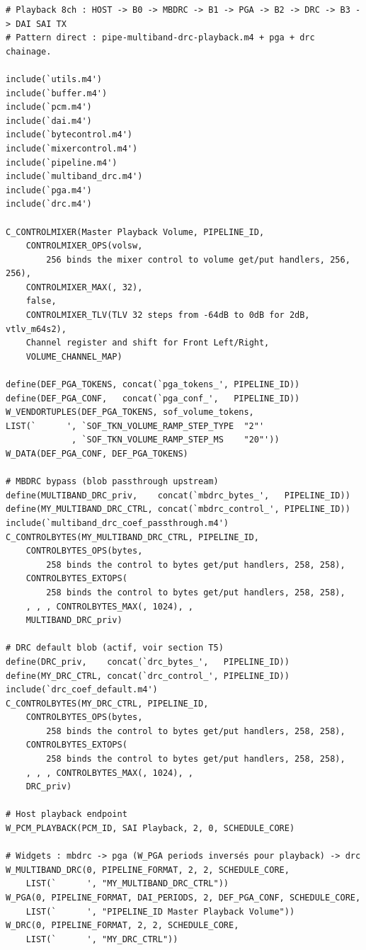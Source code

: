 \documentclass[11pt,a4paper]{article}
\begin{document}
\begin{lstlisting}[language={}, basicstyle=\ttfamily\scriptsize]
# Playback 8ch : HOST -> B0 -> MBDRC -> B1 -> PGA -> B2 -> DRC -> B3 -> DAI SAI TX
# Pattern direct : pipe-multiband-drc-playback.m4 + pga + drc chainage.

include(`utils.m4')
include(`buffer.m4')
include(`pcm.m4')
include(`dai.m4')
include(`bytecontrol.m4')
include(`mixercontrol.m4')
include(`pipeline.m4')
include(`multiband_drc.m4')
include(`pga.m4')
include(`drc.m4')

C_CONTROLMIXER(Master Playback Volume, PIPELINE_ID,
    CONTROLMIXER_OPS(volsw,
        256 binds the mixer control to volume get/put handlers, 256, 256),
    CONTROLMIXER_MAX(, 32),
    false,
    CONTROLMIXER_TLV(TLV 32 steps from -64dB to 0dB for 2dB, vtlv_m64s2),
    Channel register and shift for Front Left/Right,
    VOLUME_CHANNEL_MAP)

define(DEF_PGA_TOKENS, concat(`pga_tokens_', PIPELINE_ID))
define(DEF_PGA_CONF,   concat(`pga_conf_',   PIPELINE_ID))
W_VENDORTUPLES(DEF_PGA_TOKENS, sof_volume_tokens,
LIST(`      ', `SOF_TKN_VOLUME_RAMP_STEP_TYPE  "2"'
             , `SOF_TKN_VOLUME_RAMP_STEP_MS    "20"'))
W_DATA(DEF_PGA_CONF, DEF_PGA_TOKENS)

# MBDRC bypass (blob passthrough upstream)
define(MULTIBAND_DRC_priv,    concat(`mbdrc_bytes_',   PIPELINE_ID))
define(MY_MULTIBAND_DRC_CTRL, concat(`mbdrc_control_', PIPELINE_ID))
include(`multiband_drc_coef_passthrough.m4')
C_CONTROLBYTES(MY_MULTIBAND_DRC_CTRL, PIPELINE_ID,
    CONTROLBYTES_OPS(bytes,
        258 binds the control to bytes get/put handlers, 258, 258),
    CONTROLBYTES_EXTOPS(
        258 binds the control to bytes get/put handlers, 258, 258),
    , , , CONTROLBYTES_MAX(, 1024), ,
    MULTIBAND_DRC_priv)

# DRC default blob (actif, voir section T5)
define(DRC_priv,    concat(`drc_bytes_',   PIPELINE_ID))
define(MY_DRC_CTRL, concat(`drc_control_', PIPELINE_ID))
include(`drc_coef_default.m4')
C_CONTROLBYTES(MY_DRC_CTRL, PIPELINE_ID,
    CONTROLBYTES_OPS(bytes,
        258 binds the control to bytes get/put handlers, 258, 258),
    CONTROLBYTES_EXTOPS(
        258 binds the control to bytes get/put handlers, 258, 258),
    , , , CONTROLBYTES_MAX(, 1024), ,
    DRC_priv)

# Host playback endpoint
W_PCM_PLAYBACK(PCM_ID, SAI Playback, 2, 0, SCHEDULE_CORE)

# Widgets : mbdrc -> pga (W_PGA periods inversés pour playback) -> drc
W_MULTIBAND_DRC(0, PIPELINE_FORMAT, 2, 2, SCHEDULE_CORE,
    LIST(`      ', "MY_MULTIBAND_DRC_CTRL"))
W_PGA(0, PIPELINE_FORMAT, DAI_PERIODS, 2, DEF_PGA_CONF, SCHEDULE_CORE,
    LIST(`      ', "PIPELINE_ID Master Playback Volume"))
W_DRC(0, PIPELINE_FORMAT, 2, 2, SCHEDULE_CORE,
    LIST(`      ', "MY_DRC_CTRL"))


\end{lstlisting}
\end{document}
